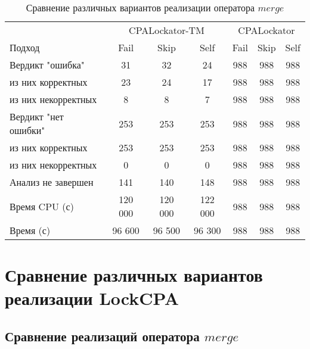 \begin{center}
  \begin{table}[h]\footnotesize
  	\label{table-drivers-thread-create}
    \caption{Сравнение различных вариантов реализации оператора $merge$}
    \begin{tabular}{ | l | c | c | c | c | c | c |}
      \hline
      		& 		\multicolumn{3}{|c|}{CPALockator-TM} 	& \multicolumn{3}{|c|}{CPALockator} \\
      Подход         				& Fail 		& Skip 		& Self 	& Fail 	& Skip 	& Self  \\ \hline
      Вердикт "ошибка" 				& 31   		& 32   		& 24   & 988   & 988   & 988   \\ 
  \hspace{0.5cm} из них корректных 	& 23 		& 24 		& 17   & 988   & 988   & 988   \\ 
  \hspace{0.5cm} из них некорректных & 8 		& 8 		& 7   & 988   & 988   & 988   \\ \hline
      Вердикт "нет ошибки"  		& 253    	& 253    	& 253    & 988   & 988  	& 988   \\ 
  \hspace{0.5cm} из них корректных 	& 253 		& 253    	& 253    & 988   & 988   & 988   \\
  \hspace{0.5cm} из них некорректных & 0 		& 0    		& 0     & 988   & 988   & 988   \\ \hline
      Анализ не завершен       		& 141    	& 140    	& 148    & 988   & 988   & 988   \\ \hline
      Время CPU (с)   				& 120 000 	& 120 000 	& 122 000 & 988 & 988  & 988   \\ 
      Время (с)  					& 96 600 	& 96 500 	& 96 300 & 988 & 988 	& 988   \\
      \hline
    \end{tabular}
  \end{table}
\end{center}

\section{Сравнение различных вариантов реализации LockCPA}

\subsection{Сравнение реализаций оператора $merge$ }

